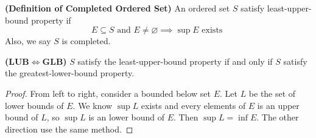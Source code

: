 \documentclass{report}
\begin{document}
\begin{definition}
  \textbf{(Definition of Completed Ordered Set)}
An ordered set $S$ satisfy least-upper-bound property if
 \begin{equation}
E\subseteq S\text{ and }E\neq \varnothing\implies \sup E\text{ exists }
\end{equation}
Also, we say $S$ is completed.
\end{definition}
\begin{theorem}
  \textbf{(LUB$\iff $GLB)} $S$ satisfy the least-upper-bound property if and only if  $S$ satisfy the greatest-lower-bound property.
\end{theorem}
\begin{proof}
  From left to right, consider a bounded below set $E$.  Let $L$ be the set of lower bounds of  $E$. We know $\sup L$ exists and every elements of $E$ is an upper bound of $L$, so $\sup L$ is an lower bound of $E$. Then $\sup L=\inf E$. The other direction use the same method. 
\end{proof}
\end{document}
